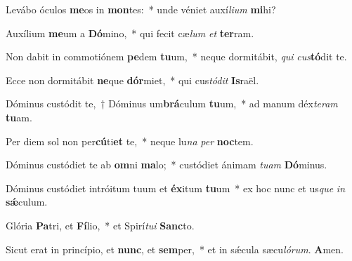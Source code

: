 \item Levábo óculos \textbf{me}os in \textbf{mon}tes:~* unde véniet auxí\textit{li}\textit{um} \textbf{mi}hi?

\item Auxílium \textbf{me}um a \textbf{Dó}mino,~* qui fecit cæ\textit{lum} \textit{et} \textbf{ter}ram.

\item Non dabit in commotiónem \textbf{pe}dem \textbf{tu}um,~* neque dormitábit, \textit{qui} \textit{cus}\textbf{tó}dit te.

\item Ecce non dormitábit \textbf{ne}que \textbf{dór}miet,~* qui cus\textit{tó}\textit{dit} \textbf{Is}raël.

\item Dóminus custódit te,~† Dóminus um\textbf{brá}culum \textbf{tu}um,~* ad manum déx\textit{te}\textit{ram} \textbf{tu}am.

\item Per diem sol non per\textbf{cú}ti\textbf{et} te,~* neque lu\textit{na} \textit{per} \textbf{noc}tem.

\item Dóminus custódiet te ab \textbf{om}ni \textbf{ma}lo;~* custódiet ánimam \textit{tu}\textit{am} \textbf{Dó}minus.

\item Dóminus custódiet intróitum tuum et \textbf{éx}itum \textbf{tu}um~* ex hoc nunc et us\textit{que} \textit{in} \textbf{sǽ}culum.

\item Glória \textbf{Pa}tri, et \textbf{Fí}lio,~* et Spirí\textit{tu}\textit{i} \textbf{Sanc}to.

\item Sicut erat in princípio, et \textbf{nunc}, et \textbf{sem}per,~* et in sǽcula sæcu\textit{ló}\textit{rum}. \textbf{A}men.